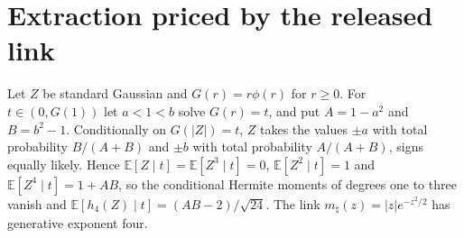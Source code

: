 \section{Extraction priced by the released link}

\begin{lemma}
Let $Z$ be standard Gaussian and $G(r)=r\phi(r)$ for $r\ge0$. For $t\in(0,G(1))$ let
$a<1<b$ solve $G(r)=t$, and put $A=1-a^2$ and $B=b^2-1$. Conditionally on
$G(\lvert Z\rvert)=t$, $Z$ takes the values $\pm a$ with total probability $B/(A+B)$
and $\pm b$ with total probability $A/(A+B)$, signs equally likely. Hence
$\mathbb E[Z\mid t]=\mathbb E[Z^3\mid t]=0$, $\mathbb E[Z^2\mid t]=1$ and
$\mathbb E[Z^4\mid t]=1+AB$, so the conditional Hermite moments of degrees one to three
vanish and $\mathbb E[h_4(Z)\mid t]=(AB-2)/\sqrt{24}$. The link
$m_\natural(z)=\lvert z\rvert e^{-z^2/2}$ has generative exponent four.
\end{lemma}

